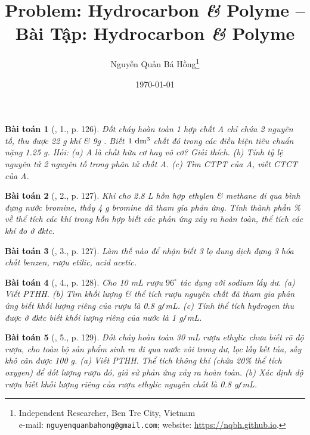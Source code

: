 \documentclass{article}
\title{Problem: Hydrocarbon {\it\&} Polyme -- Bài Tập: Hydrocarbon {\it\&} Polyme}
\author{Nguyễn Quản Bá Hồng\footnote{Independent Researcher, Ben Tre City, Vietnam\\e-mail: \texttt{nguyenquanbahong@gmail.com}; website: \url{https://nqbh.github.io}.}}
\date{\today}
\newtheorem{baitoan}{Bài toán}
\begin{document}
\maketitle
\begin{abstract}
	
\end{abstract}
\setcounter{secnumdepth}{4}
\setcounter{tocdepth}{3}
\tableofcontents


\begin{baitoan}[\cite{An_Hoa_Hoc_nang_cao_8_9}, 1., p. 126]
	Đốt cháy hoàn toàn 1 hợp chất A chỉ chứa 2 nguyên tố, thu được {\rm22 g} khí {\rm{}} \& {\rm9g }. Biết $\rm1\ dm^3$ chất đó trong các điều kiện tiêu chuẩn nặng {\rm1.25 g}. Hỏi: (a) A là chất hữu cơ hay vô cơ? Giải thích. (b) Tính tỷ lệ nguyên tử 2 nguyên tố trong phân tử chất A. (c) Tìm {\rm CTPT} của A, viết {\rm CTCT} của A.
\end{baitoan}

\begin{baitoan}[\cite{An_Hoa_Hoc_nang_cao_8_9}, 2., p. 127]
	Khi cho {\rm2.8 L} hỗn hợp ethylen \& methane đi qua bình đựng nước bromine, thấy {\rm4 g} bromine đã tham gia phản ứng. Tính thành phần {\rm\%} về thể tích các khí trong hỗn hợp biết các phản ứng xảy ra hoàn toàn, thể tích các khí đo ở đktc.
\end{baitoan}

\begin{baitoan}[\cite{An_Hoa_Hoc_nang_cao_8_9}, 3., p. 127]
	Làm thế nào để nhận biết 3 lọ dung dịch đựng 3 hóa chất benzen, rượu etilic, acid acetic.
\end{baitoan}

\begin{baitoan}[\cite{An_Hoa_Hoc_nang_cao_8_9}, 4., p. 128]
	Cho {\rm10 mL} rượu $96^\circ$ tác dụng với sodium lấy dư. (a) Viết {\rm PTHH}. (b) Tìm khối lượng \& thể tích rượu nguyên chất đã tham gia phản ứng biết khối lượng riêng của rượu là {\rm0.8 g{\tt/}mL}. (c) Tính thể tích hydrogen thu được ở đktc biết khối lượng riêng của nước là {\rm1 g{\tt/}mL}.
\end{baitoan}

\begin{baitoan}[\cite{An_Hoa_Hoc_nang_cao_8_9}, 5., p. 129]
	Đốt cháy hoàn toàn {\rm30 mL} rượu ethylic chưa biết rõ độ rượu, cho toàn bộ sản phẩm sinh ra đi qua nước vôi trong dư, lọc lấy kết tủa, sấy khô cân được {\rm100 g}. (a) Viết {\rm PTHH}. Thể tích không khí (chứa {\rm20\%} thể tích oxygen) để đốt lượng rượu đó, giả sử phản ứng xảy ra hoàn toàn. (b) Xác định độ rượu biết khối lượng riêng của rượu ethylic nguyên chất là {\rm0.8 g{\tt/}mL}.
\end{baitoan}
\end{document}
